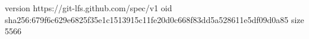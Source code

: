 version https://git-lfs.github.com/spec/v1
oid sha256:679f6c629e6825f35e1c1513915c11fe20d0c668f83dd5a528611e5df09d0a85
size 5566
